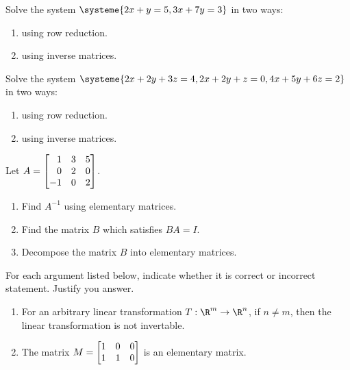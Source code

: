\begin{exercises}
\begin{problist}
		\prob Solve the system $\systeme{2x+y=5,3x+7y=3}$ in two ways:
		    \begin{enumerate}
		        \item   using row reduction.
		        \item   using inverse matrices.
		    \end{enumerate}
		
		\prob Solve the system $\systeme{2x+2y+3z=4,2x+2y+z=0, 4x+5y+6z=2}$ in two ways:
		    \begin{enumerate}
		        \item   using row reduction.
		        \item   using inverse matrices.
		    \end{enumerate}
		    
		\prob 	Let $A=\mat{1&3&5\\0&2&0\\-1&0&2}$. 
		    \begin{enumerate}
		        \item Find $A^{-1}$ using elementary matrices.
		        \item Find the matrix $B$ which satisfies $BA=I$.
		        \item Decompose the matrix $B$ into elementary matrices. 
		    \end{enumerate}  
	
		\prob For each argument listed below, indicate whether it is correct or incorrect statement. Justify you answer.
            \begin{enumerate}
                \item   For an  arbitrary linear transformation $T:\R^m\to\R^n$, if $n \neq m$, then the linear transformation is not invertable. 
                \item   The matrix $M = \mat{1&0&0\\1&1&0}$ is an elementary matrix.
            \end{enumerate}
		
	\end{problist}
\end{exercises}
